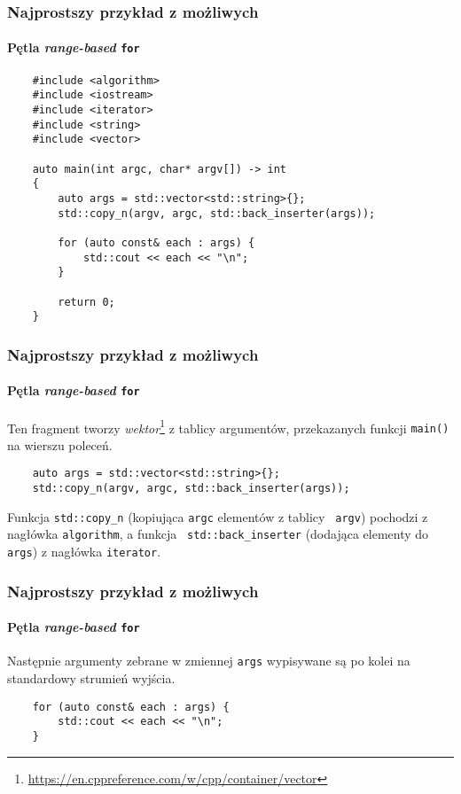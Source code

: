 \documentclass[aspectratio=169]{beamer}
\begin{document}
\begin{frame}[fragile]
    \frametitle{Najprostszy przykład z możliwych}
    \framesubtitle{Pętla \emph{range-based} {\tt for}}

    {\footnotesize
    \begin{lstlisting}
    #include <algorithm>
    #include <iostream>
    #include <iterator>
    #include <string>
    #include <vector>

    auto main(int argc, char* argv[]) -> int
    {
        auto args = std::vector<std::string>{};
        std::copy_n(argv, argc, std::back_inserter(args));

        for (auto const& each : args) {
            std::cout << each << "\n";
        }

        return 0;
    }
    \end{lstlisting}}
\end{frame}

\begin{frame}[fragile]
    \frametitle{Najprostszy przykład z możliwych}
    \framesubtitle{Pętla \emph{range-based} {\tt for}}

    Ten fragment tworzy
    \emph{wektor}\footnote{\url{https://en.cppreference.com/w/cpp/container/vector}}
    z tablicy argumentów, przekazanych funkcji {\tt main()} na wierszu poleceń.

    {\footnotesize
    \begin{lstlisting}
    auto args = std::vector<std::string>{};
    std::copy_n(argv, argc, std::back_inserter(args));
    \end{lstlisting}}

    Funkcja {\tt std::copy\_n} (kopiująca {\tt argc} elementów z tablicy {\tt
    argv}) pochodzi z nagłówka {\tt algorithm}, a funkcja {\tt
    std::back\_inserter} (dodająca elementy do {\tt args}) z nagłówka
    {\tt iterator}.
\end{frame}

\begin{frame}[fragile]
    \frametitle{Najprostszy przykład z możliwych}
    \framesubtitle{Pętla \emph{range-based} {\tt for}}

    Następnie argumenty zebrane w zmiennej {\tt args} wypisywane są po kolei na
    standardowy strumień wyjścia.

    {\footnotesize
    \begin{lstlisting}
    for (auto const& each : args) {
        std::cout << each << "\n";
    }
    \end{lstlisting}}
\end{frame}
\end{document}
